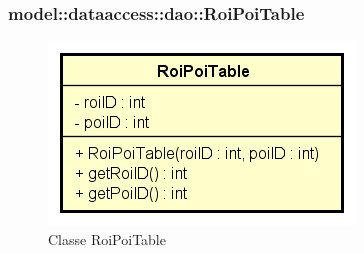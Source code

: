 \documentclass[../DefinizioneDiProdotto.tex]{subfiles}
\begin{document}
\subsubsection{model::dataaccess::dao::RoiPoiTable}

    \begin{figure}[H]
        \centering
        \includegraphics{img/RoiPoiTable.png}
        \caption{Classe RoiPoiTable}\label{fig:model::dataaccess::dao::RoiPoiTable} 
    \end{figure}
\end{document}
